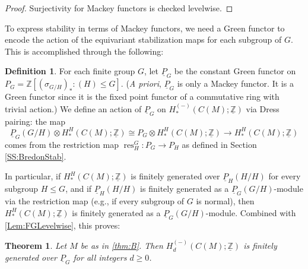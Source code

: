\documentclass[11pt]{amsart}
\newtheorem{theorem}[equation]{Theorem}
\theoremstyle{definition}
\newtheorem{definition}[equation]{Definition}
\numberwithin{equation}{subsection} %
\def\z{\mathbb{Z}}
\def\uP{\underline{P}}
\def\mfz{\underline{\mathbb{Z}}}
\def\res{\operatorname{res}}
\begin{document}
\begin{proof}
Surjectivity for Mackey functors is checked levelwise. 
\end{proof}

To express stability in terms of Mackey functors, we need a Green functor to encode the action of the equivariant stabilization maps for each subgroup of $G$. This is accomplished through the following:

\begin{definition}
For each finite group $G$, let $\uP_G$ be the constant Green functor on $P_G=\z[(\sigma_{G/H})_*: (H) \leq G]$. (\emph{A priori}, $\uP_G$ is only a Mackey functor. It is a Green functor since it is the fixed point functor of a commutative ring with trivial action.) We define an action of $\uP_G$ on $H_*^{(-)}(C(M); \mfz)$ via Dress pairing: the map
$$\uP_G(G/H) \otimes H_*^H(C(M);\mfz) \cong P_G\otimes H^H_*(C(M);\mfz) \to H_*^H(C(M);\mfz)$$
comes from the restriction map $\res^G_H:P_G\to P_H$ as defined in Section \ref{SS:BredonStab}.
\end{definition}

In particular, if $H_*^H(C(M);\mfz)$ is finitely generated over $\uP_H(H/H)$ for every subgroup $H \leq G$, and if $\uP_H(H/H)$ is finitely generated as a $\uP_G(G/H)$-module via the restriction map (e.g., if every subgroup of $G$ is normal), then $H_*^H(C(M);\mfz)$ is finitely generated as a $\uP_G(G/H)$-module. Combined with \cref{Lem:FGLevelwise}, this proves:

\begin{theorem}\label{Thm:MF}
Let $M$ be as in \cref{thm:B}. Then $H_d^{(-)}(C(M); \mfz)$ is finitely generated over $\uP_G$ for all integers $d \geq 0$.  
\end{theorem}




\end{document}
